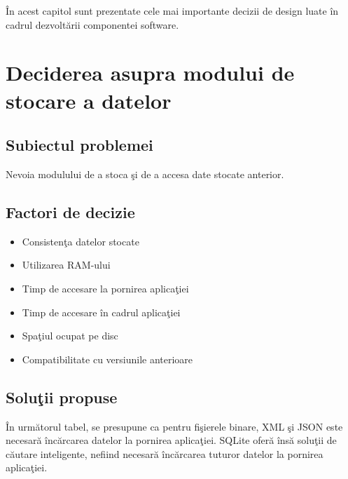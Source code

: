 \label{cap1}


\label{Chapter1} %

\thispagestyle{fancy}

În acest capitol sunt prezentate cele mai importante decizii de design luate în cadrul dezvoltării componentei software.

\section{Deciderea asupra modului de stocare a datelor} 

	\subsection{Subiectul problemei} 
	Nevoia modulului de a stoca şi de a accesa date stocate anterior.

	\subsection{Factori de decizie} 
	\begin{itemize}
	 \setlength\itemsep{0em}
		\item Consistenţa datelor stocate
		\item Utilizarea RAM-ului
		\item Timp de accesare la pornirea aplicaţiei
		\item Timp de accesare în cadrul aplicaţiei
		\item Spaţiul ocupat pe disc
		\item Compatibilitate cu versiunile anterioare
	\end{itemize}

	\subsection{Soluţii propuse}
	În următorul tabel, se presupune ca pentru fişierele binare, XML şi JSON este necesară încărcarea datelor la pornirea aplicaţiei. SQLite oferă însă soluţii de căutare inteligente, nefiind necesară încărcarea tuturor datelor la pornirea aplicaţiei.

